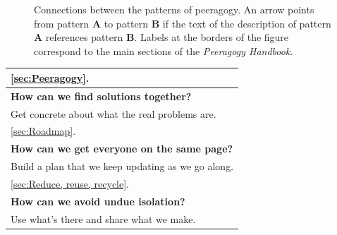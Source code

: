 \begin{figure}
\vspace{-.9in}
{\centering


\par
}
\vspace{-.9in}
\caption{Connections between the patterns of peeragogy.  An arrow points from pattern \textbf{A} to pattern \textbf{B} if the text of the description of pattern \textbf{A} references pattern \textbf{B}.  Labels at the borders of the figure correspond to the main sections of the \emph{Peeragogy Handbook}.\label{fig:connections}}
\end{figure}

\begin{table}
{\footnotesize
{}
\begin{tabularx}{\textwidth}{|C|}
\hline
\vspace{-.4em} \color{Black} \ref{sec:Peeragogy}. \vspace{.25em}\\
\hline
\vspace{.01em}
\textbf{How can we find solutions together?}\\
Get concrete about what the real problems are.
\vspace{.4em}\\
\hline 
\vspace{-.4em} \color{Black} \ref{sec:Roadmap}. \vspace{.4em}\\
\hline
\vspace{.01em}
\textbf{How can we get everyone on the same page?}\\
Build a plan that we keep updating as we go along.
\vspace{.4em}\\
\hline
\vspace{-.4em} \color{Black} \ref{sec:Reduce, reuse, recycle}. \vspace{.4em}\\
\hline
\vspace{.01em}
\textbf{How can we avoid undue isolation?}\\
Use what's there and share what we make.
\vspace{.4em}\\
\hline

\end{tabularx}}
\end{table}

